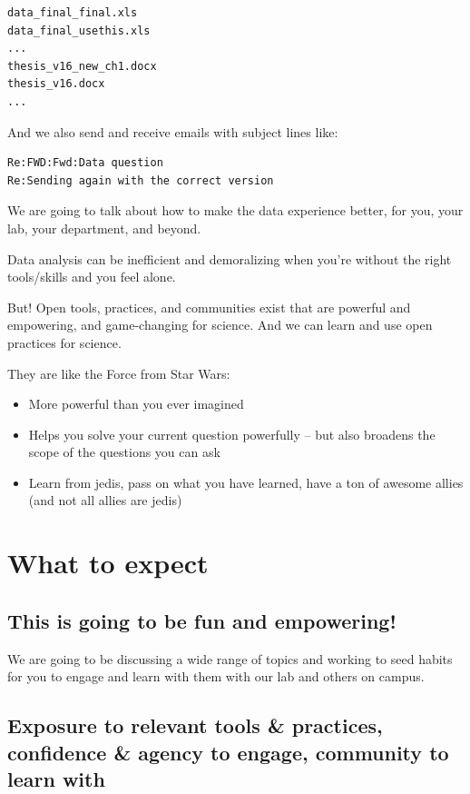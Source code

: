 \documentclass[
  letterpaper,
  DIV=11,
  numbers=noendperiod]{scrreprt}
\providecommand{\tightlist}{%
  \setlength{\itemsep}{0pt}\setlength{\parskip}{0pt}}
\begin{document}
\begin{verbatim}
data_final_final.xls
data_final_usethis.xls
...
thesis_v16_new_ch1.docx
thesis_v16.docx
...
\end{verbatim}

And we also send and receive emails with subject lines like:

\begin{verbatim}
Re:FWD:Fwd:Data question
Re:Sending again with the correct version
\end{verbatim}

We are going to talk about how to make the data experience better, for
you, your lab, your department, and beyond.

Data analysis can be inefficient and demoralizing when you're without
the right tools/skills and you feel alone.

But! Open tools, practices, and communities exist that are powerful and
empowering, and game-changing for science. And we can learn and use open
practices for science.

They are like the Force from Star Wars:

\begin{itemize}
\tightlist
\item
  More powerful than you ever imagined
\item
  Helps you solve your current question powerfully -- but also broadens
  the scope of the questions you can ask
\item
  Learn from jedis, pass on what you have learned, have a ton of awesome
  allies (and not all allies are jedis)
\end{itemize}

\hypertarget{what-to-expect}{%
\section{What to expect}\label{what-to-expect}}

\hypertarget{this-is-going-to-be-fun-and-empowering}{%
\subsection{This is going to be fun and
empowering!}\label{this-is-going-to-be-fun-and-empowering}}

We are going to be discussing a wide range of topics and working to seed
habits for you to engage and learn with them with our lab and others on
campus.

\hypertarget{exposure-to-relevant-tools-practices-confidence-agency-to-engage-community-to-learn-with}{%
\subsection{Exposure to relevant tools \& practices, confidence \&
agency to engage, community to learn
with}\label{exposure-to-relevant-tools-practices-confidence-agency-to-engage-community-to-learn-with}}
\end{document}
